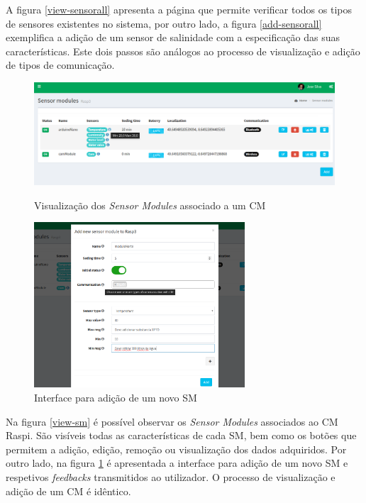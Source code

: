 A figura \ref{view-sensorall} apresenta a página que permite verificar todos os tipos de sensores existentes no sistema, por outro lado, a figura \ref{add-sensorall} exemplifica a adição de um sensor de salinidade com a especificação das suas características. Este dois passos são análogos ao processo de visualização e adição de tipos de comunicação.




\begin{figure}[h]
	\centering
	\begin{minipage}[b]{0.49\textwidth}
		\centering
		\includegraphics[width=\textwidth]{prints-web/sm_show.png}
		\caption{Visualização dos \textit{Sensor Modules} associado a um \acl{CM} }
		\label{view-sm}
	\end{minipage}
	\hfill
	\begin{minipage}[b]{0.49\textwidth}
		\centering
		\includegraphics[width=0.7\textwidth]{prints-web/sm_add.png}
		\caption{Interface para adição de um novo \acl{SM} }
		\label{add-sm}
	\end{minipage}
\end{figure}



Na figura \ref{view-sm} é possível observar os \textit{Sensor Modules} associados ao \acl{CM} Raspi. São visíveis todas as características de cada \acl{SM}, bem como os botões que permitem a adição, edição, remoção ou visualização dos dados adquiridos. Por outro lado, na figura \ref{add-sm} é apresentada a interface para adição de um novo \acl{SM} e respetivos \textit{feedbacks} transmitidos ao utilizador. O processo de visualização e adição de um \acl{CM} é idêntico. 


